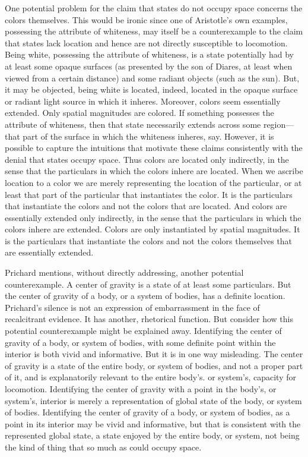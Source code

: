 One potential problem for the claim that states do not occupy space concerns the colors themselves. This would be ironic since one of Aristotle's own examples, possessing the attribute of whiteness, may itself be a counterexample to the claim that states lack location and hence are not directly susceptible to locomotion. Being white, possessing the attribute of whiteness, is a state potentially had by at least some opaque surfaces (as presented by the son of Diares, at least when viewed from a certain distance) and some radiant objects (such as the sun). But, it may be objected, being white is located, indeed, located in the opaque surface or radiant light source in which it inheres. Moreover, colors seem essentially extended. Only spatial magnitudes are colored. If something possesses the attribute of whiteness, then that state necessarily extends across some region---that part of the surface in which the whiteness inheres, say. However, it is possible to capture the intuitions that motivate these claims consistently with the denial that states occupy space. Thus colors are located only indirectly, in the sense that the particulars in which the colors inhere are located. When we ascribe location to a color we are merely representing the location of the particular, or at least that part of the particular that instantiates the color. It is the particulars that instantiate the colors and not the colors that are located. And colors are essentially extended only indirectly, in the sense that the particulars in which the colors inhere are extended. Colors are only instantiated by spatial magnitudes. It is the particulars that instantiate the colors and not the colors themselves that are essentially extended.

Prichard mentions, without directly addressing, another potential counterexample. A center of gravity is a state of at least some particulars. But the center of gravity of a body, or a system of bodies, has a definite location. Prichard's silence is not an expression of embarrassment in the face of recalcitrant evidence. It has another, rhetorical function. But consider how this potential counterexample might be explained away. Identifying the center of gravity of a body, or system of bodies, with some definite point within the interior is both vivid and informative. But it is in one way misleading. The center of gravity is a state of the entire body, or system of bodies, and not a proper part of it, and is explanatorily relevant to the entire body's. or system's, capacity for locomotion. Identifying the center of gravity with a point in the body's, or system's, interior is merely a representation of global state of the body, or system of bodies. Identifying the center of gravity of a body, or system of bodies, as a point in its interior may be vivid and informative, but that is consistent with the represented global state, a state enjoyed by the entire body, or system, not being the kind of thing that so much as could occupy space.

